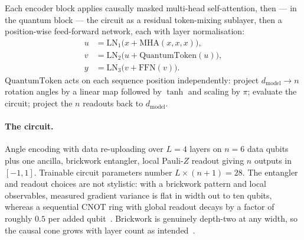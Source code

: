 \documentclass[11pt,onecolumn]{article}
\begin{document}
Each encoder block applies causally masked multi-head self-attention,
then --- in the quantum block --- the circuit as a residual token-mixing
sublayer, then a position-wise feed-forward network, each with layer
normalisation:
\begin{align}
  u &= \mathrm{LN}_1\big(x + \mathrm{MHA}(x, x, x)\big), \\
  v &= \mathrm{LN}_2\big(u + \mathrm{QuantumToken}(u)\big), \\
  y &= \mathrm{LN}_3\big(v + \mathrm{FFN}(v)\big).
\end{align}
$\mathrm{QuantumToken}$ acts on each sequence position independently:
project $d_{\mathrm{model}} \to n$ rotation angles by a linear map
followed by $\tanh$ and scaling by $\pi$; evaluate the circuit; project
the $n$ readouts back to $d_{\mathrm{model}}$.

\paragraph{The circuit.}
Angle encoding with data re-uploading over $L = 4$ layers on
$n = 6$ data qubits plus one ancilla, brickwork entangler, local
Pauli-$Z$ readout giving $n$ outputs in $[-1, 1]$. Trainable circuit
parameters number $L \times (n+1) = 28$. The entangler and readout
choices are not stylistic: with a brickwork pattern and local
observables, measured gradient variance is flat in width out to ten
qubits, whereas a sequential CNOT ring with global readout decays by a
factor of roughly $0.5$ per added qubit~\cite{papera}. Brickwork is
genuinely depth-two at any width, so the causal cone grows with layer
count as intended~\cite{cerezo2021}.
\end{document}
